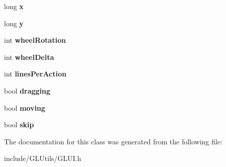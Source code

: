 \begin{DoxyCompactItemize}
\item 
\hypertarget{classCartWheel_1_1GL_1_1GLUIMouseEvent_aa95583f037335753ea4e770fdf2167fe}{
long {\bfseries x}}
\label{classCartWheel_1_1GL_1_1GLUIMouseEvent_aa95583f037335753ea4e770fdf2167fe}

\item 
\hypertarget{classCartWheel_1_1GL_1_1GLUIMouseEvent_ae52bcdb75a195a142a4f5139ff859fd8}{
long {\bfseries y}}
\label{classCartWheel_1_1GL_1_1GLUIMouseEvent_ae52bcdb75a195a142a4f5139ff859fd8}

\item 
\hypertarget{classCartWheel_1_1GL_1_1GLUIMouseEvent_a2262bcfb031d00481f4ad0de025da817}{
int {\bfseries wheelRotation}}
\label{classCartWheel_1_1GL_1_1GLUIMouseEvent_a2262bcfb031d00481f4ad0de025da817}

\item 
\hypertarget{classCartWheel_1_1GL_1_1GLUIMouseEvent_aa4a922a2cd8893ff7f4b9f42c17e49ee}{
int {\bfseries wheelDelta}}
\label{classCartWheel_1_1GL_1_1GLUIMouseEvent_aa4a922a2cd8893ff7f4b9f42c17e49ee}

\item 
\hypertarget{classCartWheel_1_1GL_1_1GLUIMouseEvent_ac613e7a43fdc30de3c527bd022fe7bff}{
int {\bfseries linesPerAction}}
\label{classCartWheel_1_1GL_1_1GLUIMouseEvent_ac613e7a43fdc30de3c527bd022fe7bff}

\item 
\hypertarget{classCartWheel_1_1GL_1_1GLUIMouseEvent_ad98dd59dff3ce788ea6b80d6fbb78109}{
bool {\bfseries dragging}}
\label{classCartWheel_1_1GL_1_1GLUIMouseEvent_ad98dd59dff3ce788ea6b80d6fbb78109}

\item 
\hypertarget{classCartWheel_1_1GL_1_1GLUIMouseEvent_a964b568ecfc0211287e8f3a2372d32fe}{
bool {\bfseries moving}}
\label{classCartWheel_1_1GL_1_1GLUIMouseEvent_a964b568ecfc0211287e8f3a2372d32fe}

\item 
\hypertarget{classCartWheel_1_1GL_1_1GLUIMouseEvent_aa6bd638a3b58a2f1761649e7fc93970d}{
bool {\bfseries skip}}
\label{classCartWheel_1_1GL_1_1GLUIMouseEvent_aa6bd638a3b58a2f1761649e7fc93970d}

\end{DoxyCompactItemize}


The documentation for this class was generated from the following file:\begin{DoxyCompactItemize}
\item 
include/GLUtils/GLUI.h\end{DoxyCompactItemize}
